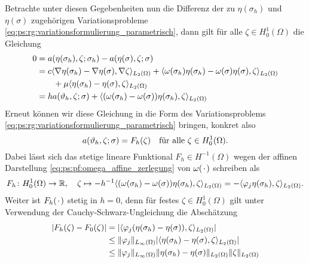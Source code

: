 \begin{Satz}
\begin{Beweis}
        Betrachte unter diesen Gegebenheiten nun die Differenz der zu $\eta(\sigma_{h})$ und $\eta(\sigma)$ zugehörigen Variationsprobleme \cref{eq:ps:rg:variationsformulierung_parametrisch}, dann gilt für alle $\zeta \in H^{1}_{0}(\Omega)$ die Gleichung
        \begin{align}
            0 &= a(\eta(\sigma_{h}), \zeta; \sigma_{h}) - a(\eta(\sigma), \zeta; \sigma)
            \\ &= c \skp{\grad \eta(\sigma_{h}) - \grad \eta(\sigma)}{\grad \zeta}{L_{2}(\Omega)}
                    + \skp{\omega(\sigma_{h})\eta(\sigma_{h}) - \omega(\sigma) \eta(\sigma)}{\zeta}{L_{2}(\Omega)}
                    \\&\qquad+ \mu \skp{\eta(\sigma_{h}) - \eta(\sigma)}{\zeta}{L_{2}(\Omega)}
            \\ &= h a(\theta_{h}, \zeta; \sigma) + \skp{(\omega(\sigma_{h}) - \omega(\sigma))\eta(\sigma_{h})}{\zeta}{L_{2}(\Omega)}
        \end{align}
        Erneut können wir diese Gleichung in die Form des Variationsproblems \cref{eq:ps:rg:variationsformulierung_parametrisch} bringen, konkret also
        \begin{equation}
            a(\theta_{h}, \zeta; \sigma) = F_{h}(\zeta) \quad \fa \zeta \in H^{1}_{0}(\Omega).
        \end{equation}
        Dabei lässt sich das stetige lineare Funktional $F_{h} \in H^{-1}(\Omega)$ wegen der affinen Darstellung \cref{eq:ps:pf:omega_affine_zerlegung} von $\omega(\blank)$ schreiben als
        \begin{equation}
            F_{h} \colon H^{1}_{0}(\Omega) \to \mathbb{R},
            \quad \zeta \mapsto - h^{-1} \skp{(\omega(\sigma_{h}) - \omega(\sigma))\eta(\sigma_{h})}{\zeta}{L_{2}(\Omega)}
            = - \skp{\varphi_{j} \eta(\sigma_{h})}{\zeta}{L_{2}(\Omega)}.
        \end{equation}
        Weiter ist $F_{h}(\blank)$ stetig in $h = 0$, denn für festes $\zeta \in H^{1}_{0}(\Omega)$ gilt unter Verwendung der Cauchy-Schwarz-Ungleichung die Abschätzung
        \begin{align}
            \abs{F_{h}(\zeta) - F_{0}(\zeta)}
            &= \abs{\skp{\varphi_{j} (\eta(\sigma_{h}) - \eta(\sigma))}{\zeta}{L_{2}(\Omega)}}
            \\&\leq \norm{\varphi_{j}}_{L_{\infty}(\Omega)} \abs{\skp{\eta(\sigma_{h}) - \eta(\sigma)}{\zeta}{L_{2}(\Omega)}}
            \\&\leq \norm{\varphi_{j}}_{L_{\infty}(\Omega)} \norm{\eta(\sigma_{h}) - \eta(\sigma)}_{L_{2}(\Omega)} \norm{\zeta}_{L_{2}(\Omega)}

\end{align}
\end{Beweis}
\end{Satz}
